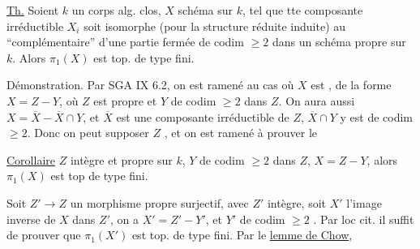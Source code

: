 \uline{Th.} Soient $k$ un corps alg. clos, $X$ schéma
 sur $k$,
tel que tte composante irréductible $X_i$ soit isomorphe
(pour la structure réduite induite) au
``complémentaire'' d'une partie fermée de codim $\geq2$ dans un schéma propre
sur $k$. Alors $\pi_1(X)$ est top. de type fini.


Démonstration. Par SGA IX 6.2, on est ramené au cas où
$X$ est ,
 de la forme $X=Z-Y$, où $Z$ est propre et $Y$ de
codim $\geq2$ dans $Z$.
On aura aussi $X=\overline X-\overline X\cap Y$,
et $\overline X$ est une composante irréductible de $Z$,
$\overline X\cap Y$ y est de codim $\geq2$.
Donc on peut supposer $Z$
,
et on est ramené à prouver le

\uline{Corollaire} $Z$ intègre et propre sur $k$, $Y$  de codim $\geq2$ dans $Z$, $X=Z-Y$,
alors $\pi_1(X)$ est top de type fini.

Soit $Z'\to Z$ un morphisme propre surjectif, avec $Z'$ intègre,
soit $X'$ l'image inverse de $X$ dans $Z'$,
on a $X'=Z'-Y'$, et $Y'$ de codim $\geq2$
.
Par loc cit. il suffit de prouver que $\pi_1(X')$ est top.
de type fini. Par le \uline{lemme de Chow},
